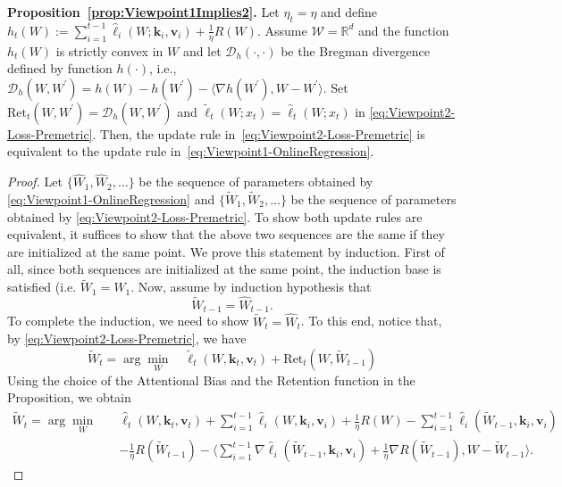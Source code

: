 \documentclass{article}
\newcommand{\vk}[0]{\mathbf{k}}
\newcommand{\vvv}[0]{\mathbf{v}}
\newcommand{\cW}[0]{\mathcal{W}}
\theoremstyle{plain}
\theoremstyle{definition}
\theoremstyle{remark}
\begin{document}
\noindent\textbf{Proposition~\ref{prop:Viewpoint1Implies2}.} Let $\eta_t = \eta$ and define~$h_t(W) :=  \sum_{i=1}^{t-1} \widehat{\ell}_i (W;\vk_i,\vvv_i) + \frac{1}{\eta}R(W)$. Assume $\cW = \mathbb{R}^d$ and the function $h_t(W)$ is strictly convex in $W$ and let $\mathcal{D}_h(\cdot,\cdot)$ be the Bregman divergence defined by function $h(\cdot)$, i.e., $\mathcal{D}_h(W,W^\prime) = h(W) - h(W^\prime) - \langle \nabla h(W^{\prime}), W-W^{\prime}\rangle$. Set $\mbox{Ret}_t(W,W^\prime) = \mathcal{D}_h(W,W^\prime)$ and $\widetilde{\ell}_t(W;x_t) = \widehat{\ell}_t(W;x_t)$ in \eqref{eq:Viewpoint2-Loss-Premetric}. Then, the update rule in~\eqref{eq:Viewpoint2-Loss-Premetric} is equivalent to the update rule in~\eqref{eq:Viewpoint1-OnlineRegression}. 
\begin{proof}
Let $\{\widehat{W}_1,\widehat{W}_2,\ldots\}$ be the sequence of parameters obtained by \eqref{eq:Viewpoint1-OnlineRegression} and $\{\widetilde{W}_1,\widetilde{W}_2,\ldots\}$ be the sequence of parameters obtained by \eqref{eq:Viewpoint2-Loss-Premetric}. To show both update rules are equivalent, it suffices to show that the above two sequences are the same if they are initialized at the same point. We prove this statement by induction. First of all, since both sequences are initialized at the same point, the induction base is satisfied (i.e. $\widetilde{W}_1 = \widehat{W}_1$. Now, assume by induction hypothesis that 
\begin{equation}
\label{eq:tempProof3}
    \widetilde{W}_{t-1} = \widehat{W}_{t-1}. 
\end{equation}
To complete the induction, we need to show $ \widetilde{W}_{t} = \widehat{W}_{t}$. To this end, notice that,
by \eqref{eq:Viewpoint2-Loss-Premetric}, we have
\[
 \widetilde{W}_{t} = \arg\min_{W} \quad \widetilde{\ell}_t (W,\vk_t,\vvv_t) + \mbox{Ret}_t(W, \widetilde{W}_{t-1})
\]
Using the choice of the Attentional Bias and the Retention function in the Proposition, we obtain
\begin{equation}
\label{eq:tempProof1}
\begin{split}
 \widetilde{W}_{t} = \arg\min_{W} \quad &\widehat{\ell}_t (W,\vk_t,\vvv_t) + \sum_{i=1}^{t-1} \widehat{\ell}_i (W,\vk_i,\vvv_i) + \frac{1}{\eta} R(W) -  \sum_{i=1}^{t-1} \widehat{\ell}_i (\widetilde{W}_{t-1},\vk_i,\vvv_i)\\
    &- \frac{1}{\eta} R(\widetilde{W}_{t-1}) - \Bigg\langle \sum_{i=1}^{t-1} \nabla \widehat{\ell}_i (\widetilde{W}_{t-1}, \vk_i,\vvv_i) + \frac{1}{\eta} \nabla R(\widetilde{W}_{t-1}), W - \widetilde{W}_{t-1} \Bigg\rangle.

\end{split}
\end{equation}
\end{proof}
\end{document}
